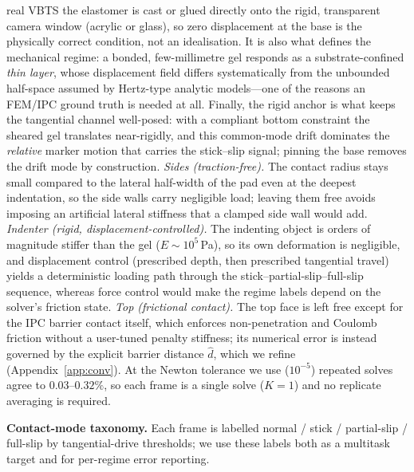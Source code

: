 \documentclass[conference]{IEEEtran}
\begin{document}
real VBTS the elastomer is cast or glued directly onto the rigid, transparent
camera window (acrylic or glass), so zero displacement at the base is the
physically correct condition, not an idealisation. It is also what defines the
mechanical regime: a bonded, few-millimetre gel responds as a
substrate-confined \emph{thin layer}, whose displacement field differs
systematically from the unbounded half-space assumed by Hertz-type analytic
models---one of the reasons an FEM/IPC ground truth is needed at all. Finally,
the rigid anchor is what keeps the tangential channel well-posed: with a
compliant bottom constraint the sheared gel translates near-rigidly, and this
common-mode drift dominates the \emph{relative} marker motion that carries the
stick--slip signal; pinning the base removes the drift mode by construction.
\emph{Sides (traction-free).} The contact radius stays small compared to the
lateral half-width of the pad even at the deepest indentation, so the side
walls carry negligible load; leaving them free avoids imposing an artificial
lateral stiffness that a clamped side wall would add. \emph{Indenter (rigid,
displacement-controlled).} The indenting object is orders of magnitude stiffer
than the gel ($E\!\sim\!10^{5}$\,Pa), so its own deformation is negligible, and
displacement control (prescribed depth, then prescribed tangential travel)
yields a deterministic loading path through the stick--partial-slip--full-slip
sequence, whereas force control would make the regime labels depend on the
solver's friction state. \emph{Top (frictional contact).} The top face is left
free except for the IPC barrier contact itself, which enforces
non-penetration and Coulomb friction without a user-tuned penalty stiffness;
its numerical error is instead governed by the explicit barrier distance
$\hat d$, which we refine (Appendix~\ref{app:conv}).
At the Newton tolerance we use ($10^{-5}$) repeated solves agree to
$0.03$--$0.32\%$, so each frame is a single solve ($K{=}1$) and no replicate
averaging is required.

\textbf{Contact-mode taxonomy.} Each frame is labelled
normal / stick / partial-slip / full-slip by tangential-drive thresholds; we
use these labels both as a multitask target and for per-regime error reporting.
\end{document}
